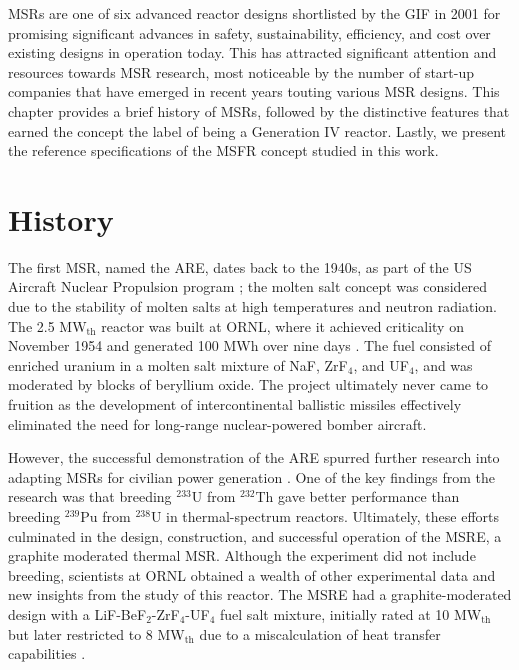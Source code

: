 \glspl{MSR} are one of six advanced reactor designs shortlisted by
the \gls{GIF} in 2001 for promising significant advances in safety,
sustainability, efficiency, and cost over existing designs in operation
today. This has attracted significant attention and resources towards
\gls{MSR} research, most noticeable by the number of start-up companies that
have emerged in recent years touting various \gls{MSR} designs. This chapter
provides a brief history of \glspl{MSR}, followed by the distinctive features
that earned the concept the label of being a Generation IV reactor. Lastly,
we present the reference specifications of the \gls{MSFR} concept studied in
this work.

\section{History}

The first \gls{MSR}, named the \gls{ARE}, dates back to the 1940s,
as part of the US Aircraft Nuclear Propulsion program
\cite{rosenthal_molten-salt_1970}; the molten salt concept was considered due
to the stability of molten salts at high temperatures and neutron radiation.
The 2.5 MW$_{\text{th}}$ reactor was built at \gls{ORNL}, where it achieved
criticality on November 1954 and generated 100 MWh over nine days
\cite{rosenthal_molten-salt_1970}. The fuel
consisted of enriched uranium in a molten salt mixture of NaF, ZrF$_4$, and
UF$_4$, and was moderated by blocks of beryllium oxide. The project ultimately
never came to fruition as the development of intercontinental ballistic
missiles effectively eliminated the need for long-range nuclear-powered
bomber aircraft.

However, the successful demonstration of the \gls{ARE} spurred further
research into adapting \glspl{MSR} for civilian power generation
\cite{rosenthal_molten-salt_1970}. One of the key findings from the
research was that breeding $^{233}$U from $^{232}$Th gave better performance
than breeding $^{239}$Pu from $^{238}$U in thermal-spectrum reactors.
Ultimately, these efforts culminated in the design, construction, and
successful operation of the \gls{MSRE}, a graphite moderated thermal
\gls{MSR}. Although the experiment did not include breeding, scientists at
\gls{ORNL} obtained a wealth of other experimental data and new insights from
the study of this reactor. The \gls{MSRE} had a
graphite-moderated design with a LiF-BeF$_2$-ZrF$_4$-UF$_4$ fuel salt mixture,
initially rated at 10 MW$_{\text{th}}$ but later restricted to 8
MW$_{\text{th}}$ due to a miscalculation of heat transfer capabilities
\cite{haubenreich_experience_1970}. 

